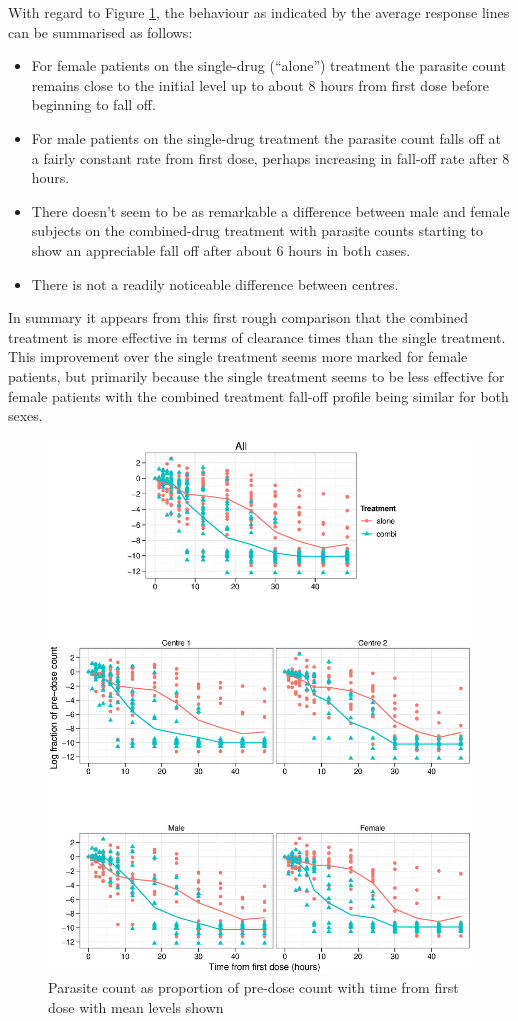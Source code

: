 With regard to Figure \ref{allaov}, the behaviour as indicated by the average response lines can be summarised as follows:
\begin{itemize}
 \item For female patients on the single-drug (``alone'') treatment the parasite count remains close to the initial level up to about 8 hours from first dose before beginning to fall off.
 \item For male patients on the single-drug treatment the parasite count falls off at a fairly constant rate from first dose, perhaps increasing in fall-off rate after 8 hours.
\item There doesn't seem to be as remarkable a difference between male and female subjects on the combined-drug treatment with parasite counts starting to show an appreciable fall off after about 6 hours in both cases.
\item There is not a readily noticeable difference between centres.
\end{itemize}
In summary it appears from this first rough comparison that the combined treatment is more effective in terms of clearance times than the single treatment. This improvement over the single treatment seems more marked for female patients, but primarily because the single treatment seems to be less effective for female patients with the combined treatment fall-off profile being similar for both sexes.
\begin{figure}
\includegraphics[width=9.2in]{allaov.eps}
\caption{Parasite count as proportion of pre-dose count with time from first dose with mean levels shown}
\label{allaov}
\end{figure}
